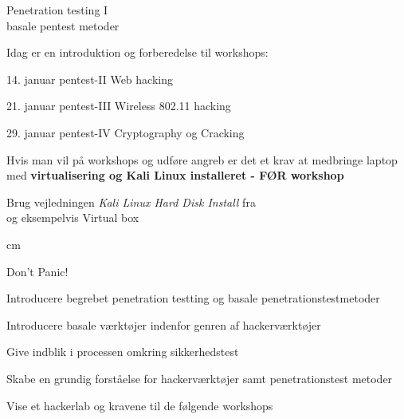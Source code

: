 \documentclass[20pt,landscape,a4paper,footrule]{foils}
\begin{document}

\mytitlepage
{Penetration testing I\\basale pentest metoder}


\LogoOn



\begin{list1}
\item Idag er en introduktion og forberedelse til workshops:
\item 14. januar pentest-II Web hacking\\
\item 21. januar pentest-III Wireless 802.11 hacking\\
\item 29. januar pentest-IV Cryptography og Cracking\\
\end{list1}


Hvis man vil på workshops og udføre angreb er det et krav at medbringe laptop med {\bf virtualisering og Kali Linux installeret - \bf FØR workshop}

Brug vejledningen \emph{Kali Linux Hard Disk Install} fra \\
 og eksempelvis Virtual box 

 cm

\centerline{\color{titlecolor}\LARGE Don't Panic!}


\begin{list1}
\item Introducere begrebet penetration testting og basale penetrationstestmetoder
\item Introducere basale værktøjer indenfor genren af hackerværktøjer
\item Give indblik i processen omkring sikkerhedstest
\item Skabe en grundig forståelse for hackerværktøjer
  samt penetrationstest metoder
\item Vise et hackerlab og kravene til de følgende workshops
\end{list1}
\end{document}
